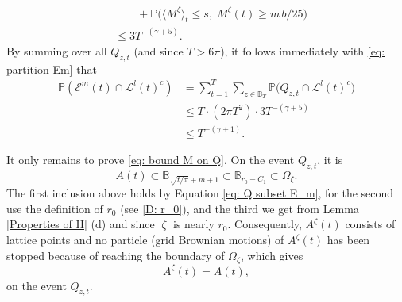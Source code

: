 \documentclass[11pt]{article}
\makeatletter
\renewenvironment{proof}[1][\proofname]{
   \par\pushQED{\qed}\normalfont
   \topsep6\p@\@plus6\p@\relax
   \trivlist\item[\hskip\labelsep\bfseries#1\@addpunct{.}]
   \ignorespaces
}{
   \popQED\endtrivlist\@endpefalse
}
\numberwithin{equation}{section}
\def\OZ{\Omega_{\zeta}}
\def\AZT{A^{\zeta}(t)}
\def\MZT{M^{\zeta}(t)}
\def\EMT{\mathcal{E}^{m}(t)}
\def\LLT{\mathcal{L}^{l}(t)}
\makeatother
\begin{document}
\begin{proof}[Proof of Lemma \ref{Early Points Imply Late Points}]
\begin{equation}
\begin{split}
      & \qquad + \mathbb{P} \big(
        \langle M^{\zeta} \rangle _t \leq s , \; 
        \MZT \geq m \, b/25 \big) \\
      & \leq 3 T^{-(\gamma + 5)}.
    \end{split}
  \end{equation}
  By summing over all $Q_{z,t}$ (and since $T > 6\pi$), 
  it follows immediately with \eqref{eq: partition Em} that
  \begin{align*}
    \mathbb{P}( \EMT \cap \LLT^c) 
    & = \sum_{t=1}^T \sum_{z \in \mathbb{B}_T} 
          \mathbb{P} \big( Q_{z,t} \cap \LLT^c \big)\\
    & \leq T \cdot (2\pi T^2) \cdot 3T^{-(\gamma + 5)}\\
    & \leq T^{-(\gamma + 1)}.
  \end{align*} 

  It only remains to prove \eqref{eq: bound M on Q}. 
  On the event $Q_{z,t}$, it is
  \begin{equation}\label{eq: A in Oz}
    A(t)  \subset \mathbb{B}_{\sqrt{t /\pi}+ m+ 1} 
          \subset \mathbb{B}_{r_0 - C_1}
          \subset \OZ.
  \end{equation}
  The first inclusion above holds by Equation \eqref{eq: Q subset E_m}, 
  for the second use the definition of \hbox{$r_0$} (see \eqref{D: r_0}), 
  and the third we get from Lemma \ref{Properties of H} (d) and since $|\zeta|$ 
  is nearly $r_0$.  
  Consequently, $\AZT$ consists of lattice points and no particle 
  (grid Brownian motions) of $\AZT$ has been stopped because of reaching 
  the boundary of $\OZ$, which gives
  $$
    \AZT = A(t),
  $$
  on the event $Q_{z,t}$. 


\end{proof}
\end{document}
